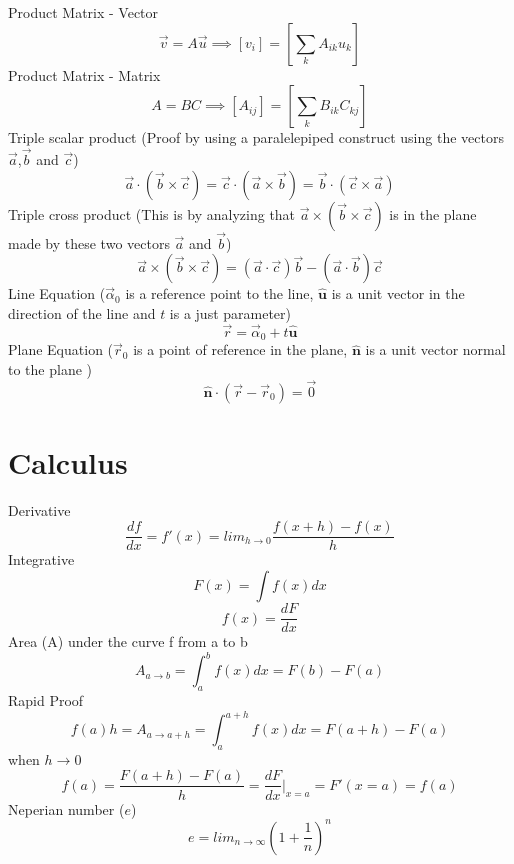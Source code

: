 \documentclass{article}
\newcommand{\uvec}[1]{\boldsymbol{\hat{\textbf{#1}}}}
\begin{document}
Product Matrix - Vector
\begin{equation}
  \vec{v} = A\vec{u} \implies [v_i] = [\sum_k A_{ik}u_k]
\end{equation}
Product Matrix - Matrix
\begin{equation}
  A = BC \implies [A_{ij}] = [\sum_k B_{ik}C_{kj}]
\end{equation}
Triple scalar product (Proof by using a paralelepiped construct using the vectors $\vec{a}$,$\vec{b}$ and $\vec{c}$)
\begin{equation}
  \vec{a} \cdot(\vec{b} \times \vec{c}) =  \vec{c} \cdot(\vec{a} \times \vec{b}) =  \vec{b} \cdot(\vec{c} \times \vec{a})
\end{equation}
Triple cross product (This is by analyzing that $\vec{a} \times (\vec{b} \times \vec{c})$ is in the plane made by these two vectors $\vec{a}$ and $\vec{b}$)
\begin{equation}
  \vec{a} \times (\vec{b} \times \vec{c}) = (\vec{a}\cdot\vec{c}) \vec{b} - (\vec{a}\cdot\vec{b}) \vec{c}
\end{equation}
Line Equation ($\vec{\alpha}_0$ is a reference point to the line, $\uvec{u}$ is a unit vector in the direction of the line and $t$ is a just parameter)
\begin{equation}
  \vec{r} = \vec{\alpha}_0 + t\uvec{u}
\end{equation}
Plane Equation ($\vec{r}_0$ is a point of reference in the plane, $\uvec{n}$ is a unit vector normal to the plane )
\begin{equation}
  \uvec{n} \cdot (\vec{r} - \vec{r}_0) = \vec{0} 
\end{equation}

\section{Calculus}
Derivative
\begin{equation}
  \frac{df}{dx} = f'(x) = lim_{h \to 0}\frac{f(x+h) - f(x)}{h}
\end{equation}
Integrative
\begin{equation}
  F(x) = \int f(x) dx
\end{equation}
\begin{equation}
  f(x) = \frac{dF}{dx}
\end{equation}
Area (A) under the curve f from a to b
\begin{equation}
  A_{a \to b} = \int_a^b f(x) dx = F(b) - F(a)
\end{equation}
Rapid Proof
\begin{equation}
   f(a)h = A_{a \to a+h} = \int_a^{a+h} f(x) dx = F(a+h) - F(a)
\end{equation}
when $h \to 0$
\begin{equation}
  f(a) = \frac{F(a+h) - F(a)}{h} = \frac{dF}{dx}\Bigr|_{x=a} = F'(x=a) = f(a)
\end{equation}
Neperian number ($e$)
\begin{equation}
  e = lim_{n \to \infty}(1 + \frac{1}{n})^n
\end{equation}
\end{document}
